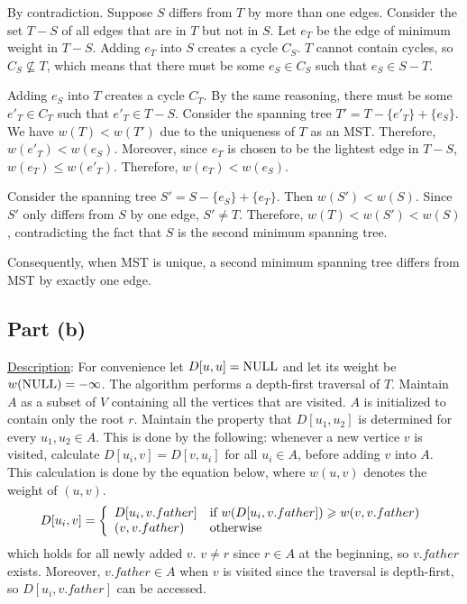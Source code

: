 \documentclass{article}
\begin{document}
By contradiction. Suppose $S$ differs from $T$ by more than one edges. Consider the set $T-S$ of all edges that are in $T$ but not in $S$. Let $e_T$ be the edge of minimum weight in $T-S$. Adding $e_T$ into $S$ creates a cycle $C_S$. $T$ cannot contain cycles, so $C_S\not\subseteq T$, which means that there must be some $e_S\in C_S$ such that $e_S\in S-T$.

Adding $e_S$ into $T$ creates a cycle $C_T$. By the same reasoning, there must be some $e'_T\in C_T$ such that $e'_T\in T-S$. Consider the spanning tree $T'=T-\{e'_T\}+\{e_S\}$. We have $w(T)<w(T')$ due to the uniqueness of $T$ as an MST. Therefore, $w(e'_T)<w(e_S)$. Moreover, since $e_T$ is chosen to be the lightest edge in $T-S$, $w(e_T)\leqslant w(e'_T)$. Therefore, $w(e_T)<w(e_S)$.

Consider the spanning tree $S'=S-\{e_S\}+\{e_T\}$. Then $w(S')<w(S)$. Since $S'$ only differs from $S$ by one edge, $S'\neq T$. Therefore, $w(T)<w(S')<w(S)$, contradicting the fact that $S$ is the second minimum spanning tree.

Consequently, when MST is unique, a second minimum spanning tree differs from MST by exactly one edge.

\subsection{Part (b)}
\noindent\underline{Description}: For convenience let $D[u,u]=\textup{NULL}$ and let its weight be $w(\textup{NULL})=-\infty$. The algorithm performs a depth-first traversal of $T$. Maintain $A$ as a subset of $V$ containing all the vertices that are visited. $A$ is initialized to contain only the root $r$. Maintain the property that $D[u_1,u_2]$ is determined for every $u_1,u_2\in A$. This is done by the following: whenever a new vertice $v$ is visited, calculate $D[u_i,v]=D[v,u_i]$ for all $u_i\in A$, before adding $v$ into $A$. This calculation is done by the equation below, where $w(u,v)$ denotes the weight of $(u,v)$.
\begin{equation*}
D[u_i,v]=\left\{\begin{array}{ll}D[u_i,v.father]&\textup{if }w(D[u_i,v.father])\geqslant w(v,v.father)\\(v,v.father)&\textup{otherwise}\end{array}\right.
\end{equation*}
which holds for all newly added $v$. $v\neq r$ since $r\in A$ at the beginning, so $v.father$ exists. Moreover, $v.father\in A$ when $v$ is visited since the traversal is depth-first, so $D[u_i,v.father]$ can be accessed.
\end{document}
